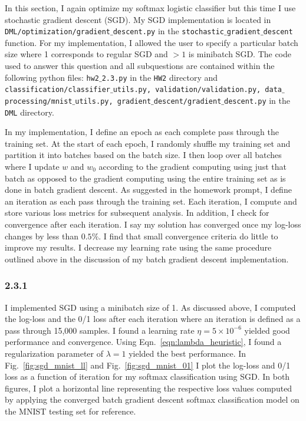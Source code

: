 \documentclass[12pt]{amsart}
\begin{document}
In this section, I again optimize my softmax logistic classifier but this time I use stochastic gradient descent (SGD).  My SGD implementation is located in {\tt DML/optimization/gradient$\_$descent.py} in the {\tt stochastic$\_$gradient$\_$descent} function.  For my implementation, I allowed the user to specify a particular batch size where 1 corresponds to regular SGD and $> 1$ is minibatch SGD.  The code used to answer this question and all subquestions are contained within the following python files: {\tt hw2$\_$2.3.py} in the {\tt HW2} directory and {\tt classification/classifier$\_$utils.py, validation/validation.py, data$\_$processing/mnist$\_$utils.py, gradient$\_$descent/gradient$\_$descent.py} in the {\tt DML} directory.

In my implementation, I define an epoch as each complete pass through the training set.  At the start of each epoch, I randomly shuffle my training set and partition it into batches based on the batch size.  I then loop over all batches where I update $w$ and $w_0$ according to the gradient computing using just that batch as opposed to the gradient computing using the entire training set as is done in batch gradient descent.  As suggested in the homework prompt, I define an iteration as each pass through the training set.  Each iteration, I compute and store various loss metrics for subsequent analysis.  In addition, I check for convergence after each iteration.  I say my solution has converged once my log-loss changes by less than $0.5\%$.  I find that small convergence criteria do little to improve my results.  I decrease my learning rate using the same procedure outlined above in the discussion of my batch gradient descent implementation.

\subsubsection*{2.3.1}

I implemented SGD using a minibatch size of 1.  As discussed above, I computed the log-loss and the 0/1 loss after each iteration where an iteration is defined as a pass through 15,000 samples.  I found a learning rate $\eta = 5 \times 10^{-6}$ yielded good performance and convergence.  Using Eqn.~\ref{eqn:lambda_heuristic}, I found a regularization parameter of $\lambda = 1$ yielded the best performance.  In Fig.~\ref{fig:sgd_mnist_ll} and Fig.~\ref{fig:sgd_mnist_01} I plot the log-loss and 0/1 loss as a function of iteration for my softmax classification using SGD.  In both figures, I plot a horizontal line representing the respective loss values computed by applying the converged batch gradient descent softmax classification model on the MNIST testing set for reference.
\end{document}
